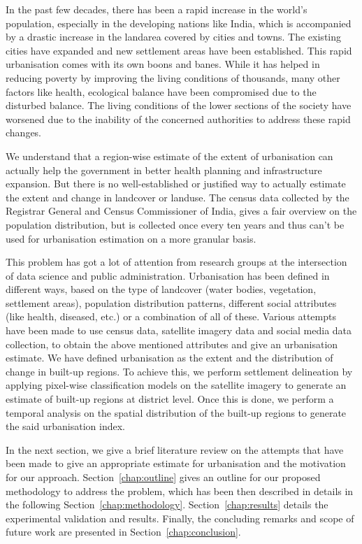In the past few decades, there has been a rapid increase in the world's population, especially in the developing nations like India, which is accompanied by a drastic increase in the landarea covered by cities and towns. The existing cities have expanded and new settlement areas have been established. This rapid urbanisation comes with its own boons and banes. While it has helped in reducing poverty by improving the living conditions of thousands, many other factors like health, ecological balance have been compromised due to the disturbed balance. The living conditions of the lower sections of the society have worsened due to the inability of the concerned authorities to address these rapid changes.

We understand that a region-wise estimate of the extent of urbanisation can actually help the government in better health planning and infrastructure expansion. But there is no well-established or justified way to actually estimate the extent and change in landcover or landuse. The census data collected by the Registrar General and Census Commissioner of India, gives a fair overview on the population distribution, but is collected once every ten years and thus can't be used for urbanisation estimation on a more granular basis.

This problem has got a lot of attention from research groups at the intersection of data science and public administration. Urbanisation has been defined in different ways, based on the type of landcover (water bodies, vegetation, settlement areas), population distribution patterns, different social attributes (like health, diseased, etc.) or a combination of all of these. Various attempts have been made to use census data, satellite imagery data and social media data collection, to obtain the above mentioned attributes and give an urbanisation estimate. We have defined urbanisation as the extent and the distribution of change in built-up regions. To achieve this, we perform settlement delineation by applying pixel-wise classification models on the satellite imagery to generate an estimate of built-up regions at district level. Once this is done, we perform a temporal analysis on the spatial distribution of the built-up regions to generate the said urbanisation index.

In the next section, we give a brief literature review on the attempts that have been made to give an appropriate estimate for urbanisation and the motivation for our approach. Section~\ref{chap:outline} gives an outline for our proposed methodology to address the problem, which has been then described in details in the following Section~\ref{chap:methodology}. Section~\ref{chap:results} details the experimental validation and results. Finally, the concluding remarks and scope of future work are presented in Section~\ref{chap:conclusion}.